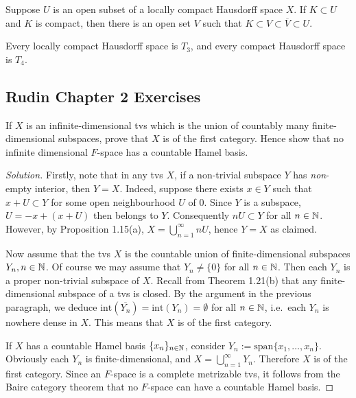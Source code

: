 \begin{theorem}
	Suppose $U$ is an open subset of a locally compact Hausdorff space $X$. If $K \subset U$ and $K$ is compact, then there is an open set $V$ such that $K \subset V \subset \overline{V} \subset U$.
\end{theorem}

\begin{corollary}
	Every locally compact Hausdorff space is $T_3$, and every compact Hausdorff space is $T_4$.
\end{corollary}

\subsection{Rudin Chapter 2 Exercises}

\begin{exercise}
	If $X$ is an infinite-dimensional tvs which is the union of countably many finite-dimensional subspaces, prove that $X$ is of the first category. Hence show that no infinite dimensional $F$-space has a countable Hamel basis.
\end{exercise}

\begin{proof}[Solution]
	Firstly, note that in any tvs $X$, if a non-trivial subspace $Y$ has \emph{non}-empty interior, then $Y = X$. Indeed, suppose there exists $x \in Y$ such that $x+U \subset Y$ for some open neighbourhood $U$ of 0. Since $Y$ is a subspace, $U = -x + (x+U)$ then belongs to $Y$. Consequently $nU \subset Y$ for all $n \in \mathbb{N}$. However, by Proposition 1.15(a), $X = \bigcup_{n=1}^\infty nU$, hence $Y=X$ as claimed.
	
	Now assume that the tvs $X$ is the countable union of finite-dimensional subspaces $Y_n, n \in \mathbb{N}$. Of course we may assume that $Y_n \ne \{0\}$ for all $n \in \mathbb{N}$. Then each $Y_n$ is a proper non-trivial subspace of $X$. Recall from Theorem 1.21(b) that any finite-dimensional subspace of a tvs is closed. By the argument in the previous paragraph, we deduce $\text{int}(\overline{Y_n}) = \text{int}(Y_n) = \emptyset$ for all $n \in \mathbb{N}$, i.e.\ each $Y_n$ is nowhere dense in $X$. This means that $X$ is of the first category.
	
	If $X$ has a countable Hamel basis $\{x_n\}_{n \in \mathbb{N}}$, consider $Y_n := \text{span}\{x_1, \ldots, x_n\}$. Obviously each $Y_n$ is finite-dimensional, and $X = \bigcup_{n=1}^\infty Y_n$. Therefore $X$ is of the first category. Since an $F$-space is a complete metrizable tvs, it follows from the Baire category theorem that no $F$-space can have a countable Hamel basis.
\end{proof}


